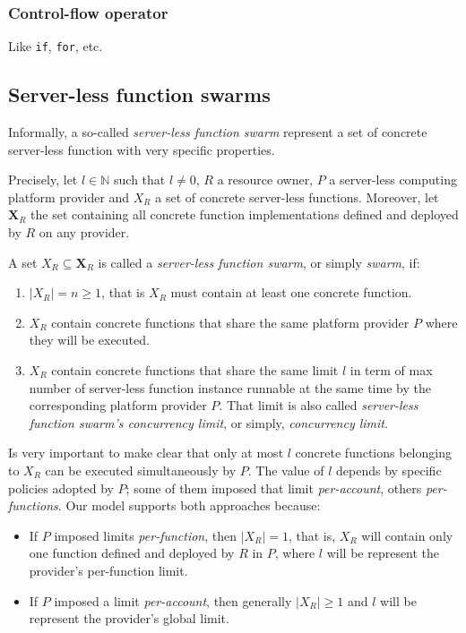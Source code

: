 \documentclass[10pt,a4paper]{article}
\begin{document}
\subsubsection{Control-flow operator}

Like \texttt{if}, \texttt{for}, etc.

\subsection{Server-less function swarms}

Informally, a so-called \textit{server-less function swarm} represent a set of concrete server-less function with very specific properties.

Precisely, let $l \in \mathbb{N}$ such that $l \neq 0$, $R$ a resource owner, $P$ a server-less computing platform provider and  $X_R$ a set of concrete server-less functions. Moreover, let $\textbf{X}_R$ the set containing all concrete function implementations defined and deployed by $R$ on any provider. 

A set $X_R \subseteq \textbf{X}_R$ is called a \textit{server-less function swarm}, or simply \textit{swarm}, if:

\begin{enumerate}
\item $|X_{R}| = n \geq 1$, that is $X_{R}$ must contain at least one concrete function.
\item $X_{R}$ contain concrete functions that share the same platform provider $P$ where they will be executed.
\item $X_{R}$ contain concrete functions that share the same limit $l$ in term of max number of server-less function instance runnable at the same time by the corresponding platform provider $P$. That limit is also called \textit{server-less function swarm's concurrency limit}, or simply, \textit{concurrency limit}. 
\end{enumerate}

Is very important to make clear that only at most $l$ concrete functions belonging to $X_R$ can be executed simultaneously by $P$. The value of $l$ depends by specific policies adopted by $P$; some of them imposed that limit \textit{per-account}, others \textit{per-functions}. Our model supports both approaches because:

\begin{itemize}

\item If $P$ imposed limits \textit{per-function}, then $|X_{R}| = 1$, that is, $X_{R}$ will contain only one function defined and deployed by $R$ in $P$, where $l$ will be represent the provider's per-function limit.

\item If $P$ imposed a limit \textit{per-account}, then generally $|X_{R}| \geq 1$ and $l$ will be represent the provider's global limit. 
\end{itemize}
\end{document}
